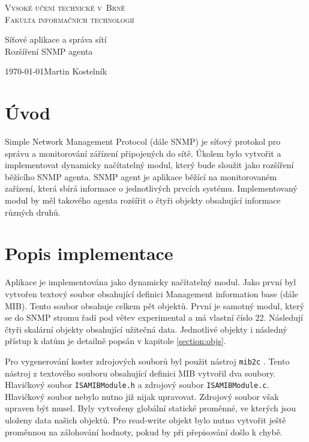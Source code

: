 \documentclass[a4paper,11pt]{article}
\begin{document}
	\begin{titlepage}
		\begin{center}
			\textsc{\Huge Vysoké učení technické v~Brně\\
				\vspace{0.4em}\huge Fakulta informačních technologií}
			
			
			{\LARGE Síťové aplikace a správa sítí\\
				\Huge Rozšíření SNMP agenta\\ \vspace{0.3em}}
			
			
			{\Large \today \hfill Martin Kostelník}
		\end{center}
	\end{titlepage}

	\tableofcontents
	
	\newpage

	\section{Úvod}
		Simple Network Management Protocol (dále SNMP) je síťový protokol pro správu a monitorování zářízení připojených do sítě. Úkolem bylo vytvořit a implementovat dynamicky načítatelný modul, který bude sloužit jako rozšíření běžícího SNMP agenta. SNMP agent je aplikace běžící na monitorovaném zařízení, která sbírá informace o jednotlivých prvcích systému. Implementovaný modul by měl takového agenta rozšířit o čtyři objekty obsahující informace různých druhů.
			
	\section{Popis implementace}
		Aplikace je implementována jako dynamicky načítatelný modul. Jako první byl vytvořen textový soubor obsahující definici Management information base (dále MIB). Tento soubor obsahuje celkem pět objektů. První je samotný modul, který se do SNMP stromu řadí pod větev experimental a má vlastní číslo 22. Následují čtyři skalární objekty obsahující užitečná data. Jednotlivé objekty i následný přístup k datům je detailně popsán v kapitole \ref{section:objs}.
		
		Pro vygenerování koster zdrojových souborů byl použit nástroj \texttt{mib2c} \cite{mib2c}. Tento nástroj z textového souboru obsahující definici MIB vytvořil dva soubory. Hlavičkový soubor \texttt{ISAMIBModule.h} a zdrojový soubor \texttt{ISAMIBModule.c}. Hlavičkový soubor nebylo nutno již nijak upravovat. Zdrojový soubor však upraven být musel. Byly vytvořeny globální statické proměnné, ve kterých jsou uloženy data našich objektů. Pro read-write objekt bylo nutno vytvořit ještě proměnnou na zálohování hodnoty, pokud by při přepisování došlo k chybě.
		
\end{document}
